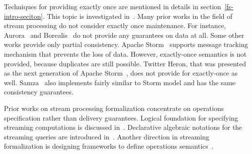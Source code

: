 
\label {fs-related-seciton}

Techniques for providing exactly once are mentioned in details in section~\ref{fs-intro-seciton}. This topic is investigated in~\cite{Carbone:2017:SMA:3137765.3137777, Akidau:2013:MFS:2536222.2536229, Zaharia:2012:DSE:2342763.2342773}. Many prior works in the field of stream processing do not consider exactly once maintenance. For instance, Aurora~\cite{Abadi:2003:ANM:950481.950485} and Borealis~\cite{abadi2005design} do not provide any guarantees on data at all. Some other works provide only partial consistency. Apache Storm~\cite{apache:storm} supports message tracking mechanism that prevents the loss of data. However, exactly-once semantics is not provided, because duplicates are still possible. Twitter Heron, that was presented as the next generation of Apache Storm~\cite{Kulkarni:2015:THS:2723372.2742788}, does not provide for exactly-once as well. Samza~\cite{Noghabi:2017:SSS:3137765.3137770} also implements fairly similar to Storm model and has the same consistency guarantees.

Prior works on stream processing formalization concentrate on operations specification rather than delivery guarantees. Logical foundation for specifying streaming computations is discussed in~\cite{alur2018interfaces}. Declarative algebraic notations for the streaming queries are introduced in~\cite{halle2014formalization}. Another direction in streaming formalization is designing frameworks to define operations semantics~\cite{beck2018lars}.